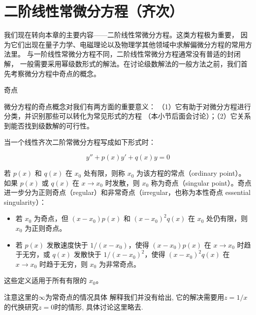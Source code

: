 
\section{二阶线性常微分方程（齐次）}
我们现在转向本章的主要内容——二阶线性常微分方程。这类方程极为重要，
因为它们出现在量子力学、电磁理论以及物理学其他领域中求解偏微分方程的常用方法里。
与一阶线性常微分方程不同，二阶线性常微分方程通常没有普适的封闭解，
一般需要采用幂级数形式的解法。在讨论级数解法的一般方法之前，我们首先考察微分方程中奇点的概念。

奇点

微分方程的奇点概念对我们有两方面的重要意义：
（1）它有助于对微分方程进行分类，并识别那些可以转化为常见形式的方程
（本小节后面会讨论）；（2）它关系到能否找到级数解的可行性。


当一个线性齐次二阶常微分方程写成如下形式时：

$$
y''+p(x) y '+q(x) y=0
$$

若 $p(x)$ 和 $q(x)$ 在 $x_0$ 处有限，则称 $x_0$ 为该方程的常点（ordinary point）。如果 $p(x)$ 或 $q(x)$ 在 $x \rightarrow x_0$ 时发散，则 $x_0$ 称为奇点（singular point）。奇点进一步分为正则奇点（regular）和非常奇点（irregular，也称为本性奇点 essential singularity）：
\begin{itemize}
    \item 若 $x_0$ 为奇点，但 $\left(x-x_0\right) p(x)$ 和 $\left(x-x_0\right)^2 q(x)$ 在 $x_0$ 处仍有限，则 $x_0$ 为正则奇点。
    \item 若 $p(x)$ 发散速度快于 $1 /\left(x-x_0\right)$，使得 $\left(x-x_0\right) p(x)$ 在 $x \rightarrow x_0$ 时趋于无穷，或 $q(x)$ 发散快于 $1 /\left(x-x_0\right)^2$，使得 $\left(x-x_0\right)^2 q(x)$ 在 $x \rightarrow x_0$ 时趋于无穷，则 $x_0$ 为非常奇点。
\end{itemize}

这些定义适用于所有有限的 $x_0$。
\begin{note}
    注意这里的$\infty$为常奇点的情况具体
    解释我们并没有给出, 它的解决需要用$z=1/x$的代换研究$z=0$时的情形, 具体讨论这里略去.
\end{note}



